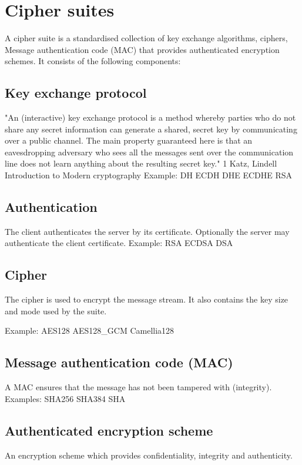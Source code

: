 \section{Cipher suites}
\label{section:CipherSuites}

A cipher suite is a standardised collection of key exchange algorithms, ciphers,
Message authentication code (MAC) that provides authenticated encryption schemes. 
It consists of the following components:

\subsection{Key exchange protocol}
"An (interactive) key exchange protocol is a method whereby parties who do not 
share any secret information can generate a shared, secret key by communicating 
over a public channel. The main property guaranteed here is that an 
eavesdropping adversary who sees all the messages sent over the communication 
line does not learn anything about the resulting secret key." {1} 
Katz, Lindell Introduction to Modern cryptography
Example: DH ECDH DHE ECDHE RSA

\subsection{Authentication}
The client authenticates the server by its certificate. Optionally the server 
may authenticate the client certificate.
Example: RSA ECDSA DSA

\subsection{Cipher}
The cipher is used to encrypt the message stream. It also contains the key size
and mode used by the suite.

Example: AES128 AES128\_GCM Camellia128 


\subsection{Message authentication code (MAC)}
A MAC ensures that the message has not been tampered with (integrity).
Examples: SHA256 SHA384 SHA


\subsection{Authenticated encryption scheme}
An encryption scheme which provides confidentiality, integrity and authenticity.

